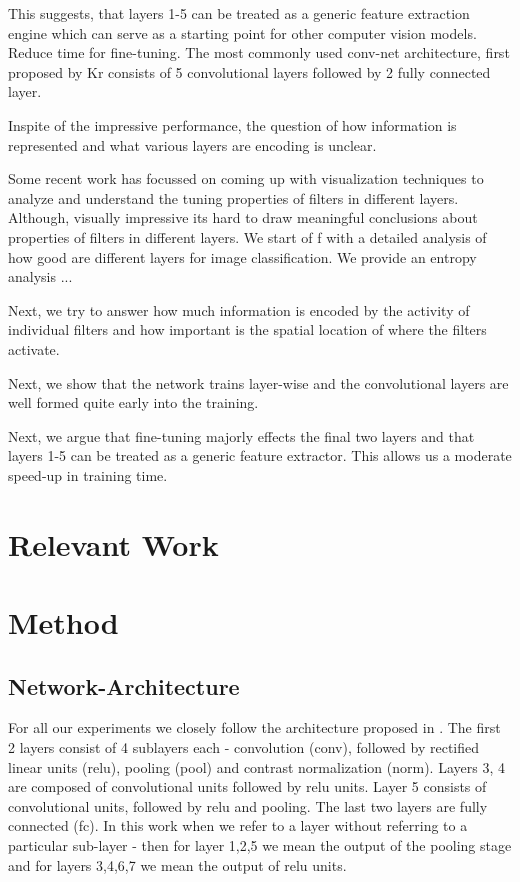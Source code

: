 \documentclass[runningheads]{llncs}
\begin{document}
This suggests, that layers 1-5 can be treated as a generic feature extraction engine which can serve as a starting point for other computer vision models. Reduce time for fine-tuning. 
The most commonly used conv-net architecture, first proposed by Kr consists of 5 convolutional layers followed by 2 fully connected layer. 
 
Inspite of the impressive performance, the question of how information is represented and what various layers are encoding is unclear. 

Some recent work has focussed on coming up with visualization techniques to analyze and understand the tuning properties of filters in different layers. Although, visually impressive its hard to draw meaningful conclusions about properties of filters in different layers. We start of f with a detailed analysis of how good are different layers for image classification. We provide an entropy analysis ...

Next, we try to answer how much information is encoded by the activity of individual filters and how important is the spatial location of where the filters activate.      

Next, we show that the network trains layer-wise and the convolutional layers are well formed quite early into the training. 

Next, we argue that fine-tuning majorly effects the final two layers and that layers 1-5 can be treated as a generic feature extractor. This allows us a moderate speed-up in training time. 

\section{Relevant Work}

\section{Method}
\subsection{Network-Architecture}
For all our experiments we closely follow the architecture proposed in \cite{alex}. The first 2 layers consist of 4 sublayers each - convolution (conv), followed by rectified linear units (relu), pooling (pool) and contrast normalization (norm). Layers 3, 4 are composed of convolutional units followed by relu units. Layer 5 consists of convolutional units, followed by relu and pooling. The last two layers are fully connected (fc). In this work when we refer to a layer without referring to a particular sub-layer - then for layer 1,2,5 we mean the output of the pooling stage and for layers 3,4,6,7 we mean the output of relu units.
\end{document}

